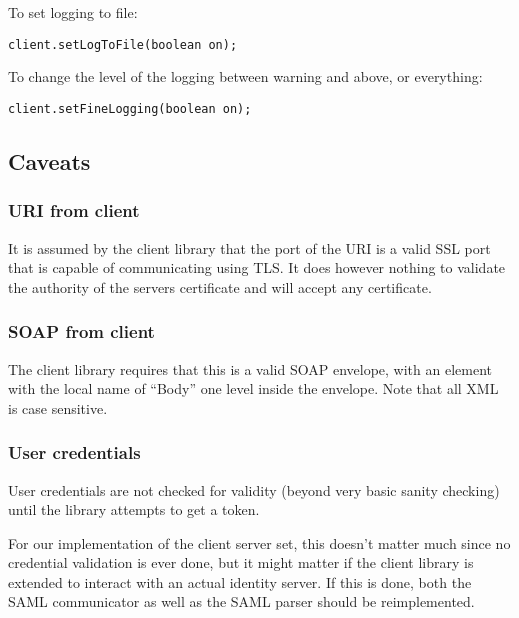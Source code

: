     To set logging to file:
    
\begin{lstlisting}[caption={Turn logging to file on or off}, label=userguideTogglelogtofile]
    client.setLogToFile(boolean on);
\end{lstlisting}

    To change the level of the logging between warning and above, or everything:

\begin{lstlisting}[caption={Switch between the two logging scopes}, label=userguideToggleloggingdetails]
    client.setFineLogging(boolean on);
\end{lstlisting}

\subsection{Caveats}\label{userguideCaveats}
    
    \subsubsection{URI from client}
    
    It is assumed by the client library that the port of the URI is a valid SSL port that is capable of communicating using TLS. It does however nothing to validate the authority of the servers certificate and will accept any certificate.

    \subsubsection{SOAP from client}
    
    The client library requires that this is a valid SOAP envelope, with an element with the local name of “Body” one level inside the envelope. Note that all XML is case sensitive.

    \subsubsection{User credentials}
    
    User credentials are not checked for validity (beyond very basic sanity checking) until the library attempts to get a token.
    
    For our implementation of the client server set, this doesn’t matter much since no credential validation is ever done, but it might matter if the client library is extended to interact with an actual identity server. If this is done, both the SAML communicator as well as the SAML parser should be reimplemented.

